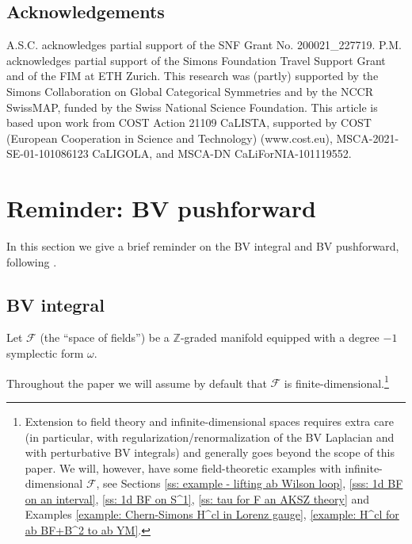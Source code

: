\documentclass{amsart}
\theoremstyle{plain} %
\theoremstyle{definition}
\theoremstyle{remark}
\newcommand{\bl}{\color{blue}}
\newcommand{\F}{\mathcal{F}}
\begin{document}
\subsection{Acknowledgements} 
A.S.C. acknowledges partial support of the SNF Grant No. 200021\_227719.
P.M. acknowledges partial support 
of the Simons Foundation Travel Support Grant and of the FIM at ETH Zurich. 
This research was (partly) supported by the Simons Collaboration on Global Categorical Symmetries and by
the NCCR SwissMAP, funded
by the Swiss National Science Foundation. This article is based upon
work from COST Action 21109 CaLISTA, supported by COST (European Cooperation in Science and Technology) (www.cost.eu), MSCA-2021-SE-01-101086123 CaLIGOLA, and
MSCA-DN CaLiForNIA-101119552.




\section{Reminder: BV pushforward}\label{sec: BV pushforward}
In this section we give a brief reminder on the BV integral and BV pushforward, following \cite[Sections 2.2.1, 2.2.2]{CMRpert}.


\subsection{BV integral}\label{ss: BV integral}
Let $\F$ (the ``space of fields'') be a %
$\mathbb{Z}$-graded manifold equipped with a degree $-1$ symplectic form $\omega$. 

Throughout the paper we will assume by default that $\F$ is finite-dimensional.\footnote{ 
Extension to field theory and infinite-dimensional spaces requires extra care (in particular, with regularization/renormalization of the BV Laplacian and with perturbative BV integrals) and generally goes beyond the scope of this paper. 
We will, however, have some field-theoretic examples with infinite-dimensional $\F$, see Sections \ref{ss: example - lifting ab Wilson loop}, \ref{sss: 1d BF on an interval}, \ref{ss: 1d BF on S^1}, \ref{ss: tau for F an AKSZ theory} and Examples \ref{example: Chern-Simons H^cl in Lorenz gauge}, \ref{example: H^cl for ab BF+B^2 to ab YM}.
}
\end{document}
